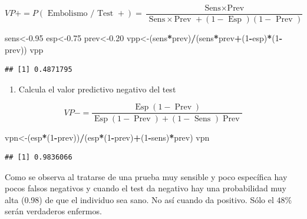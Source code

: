 \documentclass[
]{article}
\newenvironment{Shaded}{\begin{snugshade}}{\end{snugshade}}
\newcommand{\DecValTok}[1]{\textcolor[rgb]{0.00,0.00,0.81}{#1}}
\newcommand{\FloatTok}[1]{\textcolor[rgb]{0.00,0.00,0.81}{#1}}
\newcommand{\NormalTok}[1]{#1}
\newcommand{\OtherTok}[1]{\textcolor[rgb]{0.56,0.35,0.01}{#1}}
\newcommand{\SpecialCharTok}[1]{\textcolor[rgb]{0.81,0.36,0.00}{\textbf{#1}}}
\providecommand{\tightlist}{%
  \setlength{\itemsep}{0pt}\setlength{\parskip}{0pt}}
\begin{document}
\[
V P+=P(\text { Embolismo } / \text { Test }+)=\frac{\text { Sens}\times\text{Prev }}{\text { Sens}\times\text{Prev }+(1-\text { Esp })(1-\text { Prev })}
\]

\begin{Shaded}
\begin{Highlighting}[]
\NormalTok{sens}\OtherTok{\textless{}{-}}\FloatTok{0.95}
\NormalTok{esp}\OtherTok{\textless{}{-}}\FloatTok{0.75}
\NormalTok{prev}\OtherTok{\textless{}{-}}\FloatTok{0.20}
\NormalTok{vpp}\OtherTok{\textless{}{-}}\NormalTok{(sens}\SpecialCharTok{*}\NormalTok{prev)}\SpecialCharTok{/}\NormalTok{(sens}\SpecialCharTok{*}\NormalTok{prev}\SpecialCharTok{+}\NormalTok{(}\DecValTok{1}\SpecialCharTok{{-}}\NormalTok{esp)}\SpecialCharTok{*}\NormalTok{(}\DecValTok{1}\SpecialCharTok{{-}}\NormalTok{prev))}
\NormalTok{vpp}
\end{Highlighting}
\end{Shaded}

\begin{verbatim}
## [1] 0.4871795
\end{verbatim}

\begin{enumerate}
\def\labelenumi{\alph{enumi})}
\setcounter{enumi}{1}
\tightlist
\item
  Calcula el valor predictivo negativo del test
\end{enumerate}

\[
V P-=\frac{\operatorname{Esp}(1-\operatorname{Prev})}{\operatorname{Esp}(1-\operatorname{Prev})+(1-\text { Sens }) \operatorname{Prev}}
\]

\begin{Shaded}
\begin{Highlighting}[]
\NormalTok{vpn}\OtherTok{\textless{}{-}}\NormalTok{(esp}\SpecialCharTok{*}\NormalTok{(}\DecValTok{1}\SpecialCharTok{{-}}\NormalTok{prev))}\SpecialCharTok{/}\NormalTok{(esp}\SpecialCharTok{*}\NormalTok{(}\DecValTok{1}\SpecialCharTok{{-}}\NormalTok{prev)}\SpecialCharTok{+}\NormalTok{(}\DecValTok{1}\SpecialCharTok{{-}}\NormalTok{sens)}\SpecialCharTok{*}\NormalTok{prev)}
\NormalTok{vpn}
\end{Highlighting}
\end{Shaded}

\begin{verbatim}
## [1] 0.9836066
\end{verbatim}

Como se observa al tratarse de una prueba muy sensible y poco específica hay pocos falsos negativos y cuando el test da negativo hay una probabilidad muy alta (0.98) de que el individuo sea sano. No así cuando da positivo. Sólo el \(48 \%\) serán verdaderos enfermos.
\end{document}

